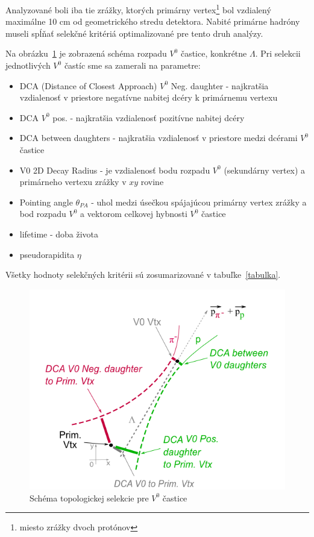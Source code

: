 \documentclass[thesismargins, thesislinespacing]{rnthesis}
\begin{document}
Analyzované boli iba tie zrážky, ktorých primárny vertex\footnote{miesto zrážky dvoch protónov} bol vzdialený maximálne 10 cm od geometrického stredu detektora. Nabité primárne hadróny museli spĺňať selekčné kritériá optimalizované pre tento druh analýzy.

Na obrázku~\ref{schema} je zobrazená schéma rozpadu $V^0$ častice, konkrétne $\Lambda$. Pri selekcii jednotlivých $V^0$ častíc sme sa zamerali na parametre:
\begin{itemize}
	\item DCA (Distance of Closest Approach) $V^0$ Neg. daughter - najkratšia vzdialenosť v priestore negatívne nabitej dcéry k primárnemu vertexu
	\item DCA $V^0$ pos. - najkratšia vzdialenosť pozitívne nabitej dcéry
	\item DCA between daughters - najkratšia vzdialenosť v priestore medzi dcérami $V^0$ častice
	\item V0 2D Decay Radius  - je vzdialenosť bodu rozpadu $V^0$ (sekundárny vertex) a primárneho vertexu zrážky v $xy$ rovine
	\item Pointing angle $\theta_{PA}$ - uhol medzi úsečkou spájajúcou primárny vertex zrážky a bod rozpadu $V^0$ a vektorom celkovej hybnosti $V^0$ častice
	\item lifetime - doba života
	\item pseudorapidita $\eta$
\end{itemize} 
Všetky hodnoty selekčných kritérii sú zosumarizované v tabuľke~\ref{tabulka}.

\begin{figure}[hbtp!]
	\centering
	\includegraphics[scale=0.9]{./Obrazky_praca/SchemaV0.png}
	\caption{Schéma topologickej selekcie pre $V^0$ častice~\cite{schema}}
	\label{schema} 
\end{figure}
\end{document}

